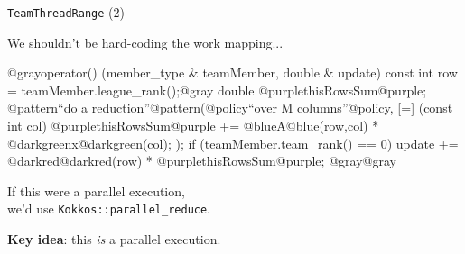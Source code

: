 \begin{frame}[fragile]{\texttt{TeamThreadRange} (2)}

  We shouldn't be hard-coding the work mapping...

  \begin{code}[linebackgroundcolor={
        \btLstHL<1->{6}{bodyColor}
      },
      keywords={}
    ]
@grayoperator() (member_type & teamMember, double & update) {
  const int row = teamMember.league_rank();@gray
  double @purplethisRowsSum@purple;
  @pattern``do a reduction''@pattern(@policy``over M columns''@policy,
    [=] (const int col) {
      @purplethisRowsSum@purple += @blueA@blue(row,col) * @darkgreenx@darkgreen(col);
    });
  if (teamMember.team_rank() == 0) {
    update += @darkred@darkred(row) * @purplethisRowsSum@purple;
  }
@gray}@gray
  \end{code}

  \pause
  \vspace{5pt}

  If this were a parallel execution, \\
    \hspace{20pt}we'd use \texttt{Kokkos::parallel\_reduce}.

  \pause
  \vspace{5pt}

  \textbf{Key idea}: this \emph{is} a parallel execution.

  \pause
  \vspace{5pt}


\end{frame}


